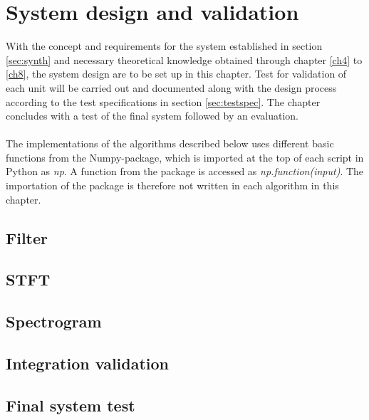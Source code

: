 \chapter{System design and validation} \label{ch10}
With the concept and requirements for the system established in section \ref{sec:synth} and necessary theoretical knowledge obtained through chapter \ref{ch4} to \ref{ch8}, the system design are to be set up in this chapter. Test for validation of each unit will be carried out and documented along with the design process according to the test specifications in section \ref{sec:testspec}. The chapter concludes with a test of the final system followed by an evaluation.
\\ \\
The implementations of the algorithms described below uses different basic functions from the Numpy-package, which is imported at the top of each script in Python as \textit{np}. A function from the package is accessed as \textit{np.function(input)}. The importation of the package is therefore not written in each algorithm in this chapter.



\section{Filter}


\section{STFT}


\section{Spectrogram}

\section{Integration validation}

\section{Final system test}


